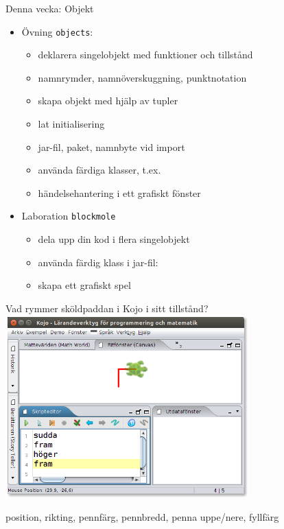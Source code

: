 
\ifkompendium\else
\begin{SlideAdmin}{Denna vecka: Objekt}
\begin{itemize}
\item Övning \texttt{objects}:
\begin{itemize}
\item deklarera singelobjekt med funktioner och tillstånd
\item namnrymder, namnöverskuggning, punktnotation
\item skapa objekt med hjälp av tupler
\item lat initialisering
\item jar-fil, paket, namnbyte vid import
\item använda färdiga klasser, t.ex. 
\item händelsehantering i ett grafiskt fönster
\end{itemize}

\item Laboration \texttt{blockmole}
\begin{itemize}
  \item dela upp din kod i flera singelobjekt
  \item använda färdig klass i jar-fil: 
  \item skapa ett grafiskt spel
\end{itemize}
\end{itemize}
\end{SlideAdmin}
\fi





\begin{Slide}{Vad rymmer sköldpaddan i Kojo i sitt tillstånd?}
\centering
\includegraphics[width=0.7\textwidth]{../img/kojo}

\pause position, rikting, pennfärg, pennbredd, penna uppe/nere, fyllfärg
\end{Slide}



